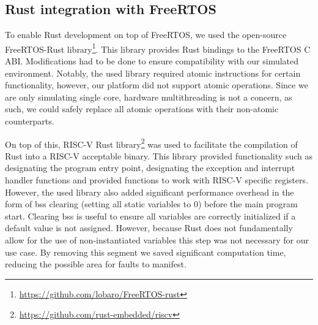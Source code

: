 \subsection{Rust integration with FreeRTOS}

To enable Rust development on top of FreeRTOS, we used the open-source FreeRTOS-Rust library\footnote{\url{https://github.com/lobaro/FreeRTOS-rust}}. This library provides Rust bindings to the FreeRTOS C ABI. Modifications had to be done to ensure compatibility with our simulated environment. Notably, the used library required atomic instructions for certain functionality, however, our platform did not support atomic operations. Since we are only simulating single core, hardware multithreading is not a concern, as such, we could safely replace all atomic operations with their non-atomic counterparts.

On top of this, RISC-V Rust library\footnote{\url{https://github.com/rust-embedded/riscv}} was used to facilitate the compilation of Rust into a RISC-V acceptable binary. This library provided functionality such as designating the program entry point, designating the exception and interrupt handler functions and provided functions to work with RISC-V specific registers. However, the used library also added significant performance overhead in the form of \acrfull{bss} clearing (setting all static variables to 0) before the main program start. Clearing \acrshort{bss} is useful to ensure all variables are correctly initialized if a default value is not assigned. However, because Rust does not fundamentally allow for the use of non-instantiated variables this step was not necessary for our use case. By removing this segment we saved significant computation time, reducing the possible area for faults to manifest.